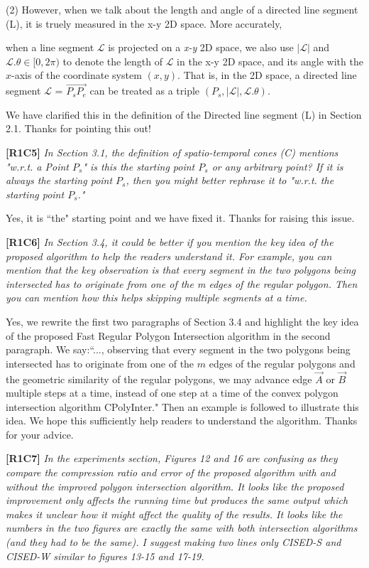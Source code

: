\documentclass{letter}
\newcommand{\vv}{\overrightarrow}
\begin{document}
(2) However, when we talk about the length and angle of a directed line segment (L), it is truely measured in the x-y 2D space. More accurately, {when a line segment $\mathcal{L}$ is projected on a \emph{x-y} 2D space, we also use $|\mathcal{L}|$ and $\mathcal{L}.\theta\in [0, 2\pi)$ to denote the length of $\mathcal{L}$ in the x-y 2D space, and its angle with the $x$-axis of the coordinate system $(x, y)$.  That is, in the 2D space, a directed line segment $\mathcal{L}$ = $\vv{P_{s}P_{e}}$ can be treated as a triple $(P_s, |\mathcal{L}|, \mathcal{L}.\theta)$.

We have clarified this in the definition of the Directed line segment (L) in Section 2.1. Thanks for pointing this out!


\textbf{[R1C5]} \emph{In Section 3.1, the definition of spatio-temporal cones (C) mentions "w.r.t. a Point $P_s$" is this the starting point $P_s$ or any arbitrary point? If it is always the starting point $P_s$, then you might better rephrase it to "w.r.t. the starting point $P_s$."}

Yes, it is ``the" starting point and we have fixed it. Thanks for raising this issue.

\textbf{[R1C6]} \emph{In Section 3.4, it could be better if you mention the key idea of the proposed algorithm to help the readers understand it. For example, you can mention that the key observation is that every segment in the two polygons being intersected has to originate from one of the m edges of the regular polygon. Then you can mention how this helps skipping multiple segments at a time.}

Yes, we rewrite the first two paragraphs of Section 3.4 and highlight the key idea of the proposed Fast Regular Polygon Intersection algorithm in the second paragraph.
{We say:``..., observing that every segment in the two polygons being intersected has to originate from one of the $m$ edges of the regular polygons and the geometric similarity of the regular polygons,
we may advance edge $\vv{A}$ or $\vv{B}$ multiple steps at a time, instead of one step at a time of the convex polygon intersection algorithm CPolyInter."} Then an example is followed to illustrate this idea.
We hope this sufficiently help readers to understand the algorithm. Thanks for your advice.



\textbf{[R1C7]} \emph{In the experiments section, Figures 12 and 16 are confusing as they compare the compression ratio and error of the proposed algorithm with and without the improved polygon intersection algorithm. It looks like the proposed improvement only affects the running time but produces the same output which makes it unclear how it might affect the quality of the results. It looks like the numbers in the two figures are exactly the same with both intersection algorithms (and they had to be the same). I suggest making two lines only CISED-S and CISED-W similar to figures 13-15 and 17-19.}

}
\end{document}
